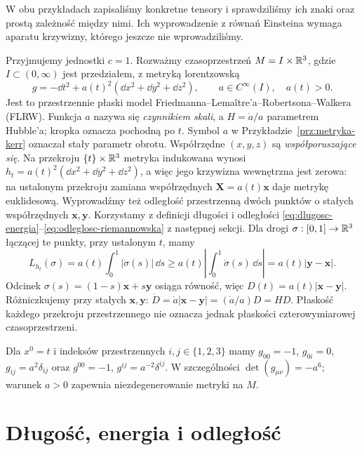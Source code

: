 W obu przykładach zapisaliśmy konkretne tensory
i sprawdziliśmy ich znaki oraz prostą zależność
między nimi. Ich wyprowadzenie z równań Einsteina
wymaga aparatu krzywizny, którego jeszcze nie
wprowadziliśmy.

\begin{przyklad}
\label{prz:flrw-metryka}
Przyjmujemy jednostki $c=1$. Rozważmy czasoprzestrzeń
$M=I\times\mathbb{R}^3$, gdzie $I\subset(0,\infty)$ jest przedziałem,
z metryką lorentzowską
\begin{equation}\label{eq:flrw-metryka}
 g=-\dd t^2+a(t)^2(\dd x^2+\dd y^2+\dd z^2),
 \qquad a\in C^\infty(I),\quad a(t)>0.
\end{equation}
Jest to przestrzennie płaski model Friedmanna--Lemaître'a--Robertsona--Walkera
(FLRW). Funkcja $a$ nazywa się \emph{czynnikiem skali}, a
$H=\dot a/a$ parametrem Hubble'a; kropka oznacza pochodną po $t$.
Symbol $a$ w Przykładzie~\ref{prz:metryka-kerr} oznaczał
stały parametr obrotu. Współrzędne $(x,y,z)$ są
\emph{współporuszające się}.
Na przekroju $\{t\}\times\mathbb{R}^3$ metryka indukowana wynosi
$h_t=a(t)^2(\dd x^2+\dd y^2+\dd z^2)$, a więc jego
krzywizna wewnętrzna jest zerowa: na ustalonym przekroju
zamiana współrzędnych $\mathbf X=a(t)\mathbf x$ daje metrykę
euklidesową. Wyprowadźmy też odległość przestrzenną dwóch
punktów o stałych współrzędnych $\mathbf x,\mathbf y$.
Korzystamy z definicji długości i odległości
\eqref{eq:dlugosc-energia}--\eqref{eq:odleglosc-riemannowska}
z następnej sekcji. Dla drogi $\sigma:[0,1]\to\mathbb{R}^3$
łączącej te punkty, przy ustalonym $t$, mamy
\[
 L_{h_t}(\sigma)
 =a(t)\int_0^1|\dot\sigma(s)|\,\dd s
 \geq a(t)\left|\int_0^1\dot\sigma(s)\,\dd s\right|
 =a(t)|\mathbf y-\mathbf x|.
\]
Odcinek $\sigma(s)=(1-s)\mathbf x+s\mathbf y$ osiąga
równość, więc $D(t)=a(t)|\mathbf x-\mathbf y|$.
Różniczkujemy przy stałych $\mathbf x,\mathbf y$:
$\dot D=\dot a|\mathbf x-\mathbf y|=(\dot a/a)D=HD$.
Płaskość każdego przekroju przestrzennego nie oznacza jednak
płaskości czterowymiarowej czasoprzestrzeni.

Dla $x^0=t$ i indeksów przestrzennych $i,j\in\{1,2,3\}$
mamy $g_{00}=-1$, $g_{0i}=0$, $g_{ij}=a^2\delta_{ij}$
oraz $g^{00}=-1$, $g^{ij}=a^{-2}\delta^{ij}$.
W szczególności $\det(g_{\mu\nu})=-a^6$; warunek $a>0$
zapewnia niezdegenerowanie metryki na $M$.
\end{przyklad}

\section{Długość, energia i odległość}
\label{sec:metryka-dlugosc-energia}


